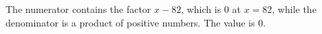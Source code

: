 The numerator contains the factor $x-82$, which is $0$ at $x=82$, while the denominator is a product of positive numbers. The value is $\boxed{0}$.
